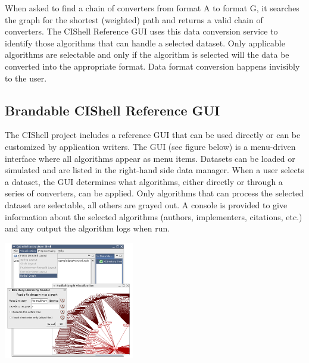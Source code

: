 When asked to find a chain of converters from format A to format G, it searches 
the graph for the shortest (weighted) path and returns a valid chain of 
converters. The CIShell Reference GUI uses this data conversion service to 
identify those algorithms that can handle a selected dataset. Only applicable 
algorithms are selectable and only if the algorithm is selected will the data 
be converted into the appropriate format. Data format conversion happens 
invisibly to the user.

\subsection{Brandable CIShell Reference GUI}

The CIShell project includes a reference GUI that can be used directly or can 
be customized by application writers. The GUI (see figure below) is a 
menu-driven interface where all algorithms appear as menu items. Datasets can 
be loaded or simulated and are listed in the right-hand side data manager. When 
a user selects a dataset, the GUI determines what algorithms, either directly 
or through a series of converters, can be applied. Only algorithms that can 
process the selected dataset are selectable, all others are grayed out. A 
console is provided to give information about the selected algorithms (authors, 
implementers, citations, etc.) and any output the algorithm logs when run.

\begin{center}
\includegraphics[width=2.24in]{graphics/cishell-using1.png}
\end{center}